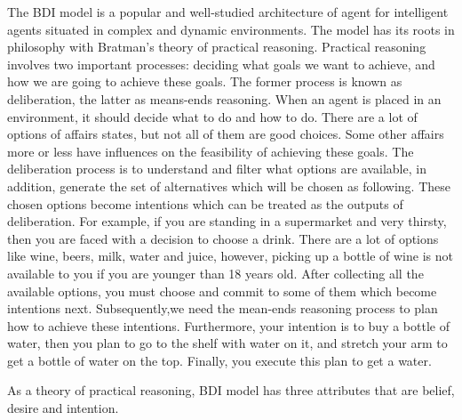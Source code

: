 The BDI model is a popular and well-studied architecture of agent for intelligent agents situated in complex and dynamic environments. The model has its roots in philosophy with Bratman’s theory of practical reasoning\cite{Sebastian_Hierarchical_2006}. Practical reasoning involves two important processes: deciding what goals we want to achieve, and how we are going to achieve these goals. The former process is known as deliberation, the latter as means-ends reasoning\cite{Gerhard_MultiSystem_1999}. When an agent is placed in an environment, it should decide what to do and how to do. There are a lot of options of affairs states, but not all of them are good choices. Some other affairs more or less have influences on the feasibility of achieving these goals. The deliberation process is to understand and filter what options are available, in addition, generate the set of alternatives which will be chosen as following. These chosen options become intentions which can be treated as the outputs of deliberation. For example, if you are standing in a supermarket and very thirsty, then you are faced with a decision to choose a drink. There are a lot of options like wine, beers, milk, water and juice, however, picking up a bottle of wine is not available to you if you are younger than 18 years old. After collecting all the available options, you must choose and commit to some of them which become intentions next. Subsequently,we need the mean-ends reasoning process to plan how to achieve these intentions. Furthermore, your intention is to buy a bottle of water, then you plan to go to the shelf with water on it, and stretch your arm to get a bottle of water on the top. Finally, you execute this plan to get a water.

As a theory of practical reasoning, BDI model has three attributes that are belief, desire and intention.



